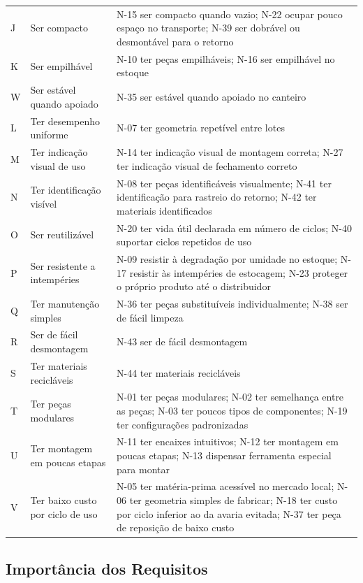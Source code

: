 \begin{longtable}{@{}L{1.1cm}@{\hspace{0.35cm}}L{4.0cm}@{\hspace{0.35cm}}L{9.8cm}@{}}
J & Ser compacto & N-15 ser compacto quando vazio; N-22 ocupar pouco espaço no transporte; N-39 ser dobrável ou desmontável para o retorno \\
K & Ser empilhável & N-10 ter peças empilháveis; N-16 ser empilhável no estoque \\
W & Ser estável quando apoiado & N-35 ser estável quando apoiado no canteiro \\
L & Ter desempenho uniforme & N-07 ter geometria repetível entre lotes \\
M & Ter indicação visual de uso & N-14 ter indicação visual de montagem correta; N-27 ter indicação visual de fechamento correto \\
N & Ter identificação visível & N-08 ter peças identificáveis visualmente; N-41 ter identificação para rastreio do retorno; N-42 ter materiais identificados \\
O & Ser reutilizável & N-20 ter vida útil declarada em número de ciclos; N-40 suportar ciclos repetidos de uso \\
P & Ser resistente a intempéries & N-09 resistir à degradação por umidade no estoque; N-17 resistir às intempéries de estocagem; N-23 proteger o próprio produto até o distribuidor \\
Q & Ter manutenção simples & N-36 ter peças substituíveis individualmente; N-38 ser de fácil limpeza \\
R & Ser de fácil desmontagem & N-43 ser de fácil desmontagem \\
S & Ter materiais recicláveis & N-44 ter materiais recicláveis \\
T & Ter peças modulares & N-01 ter peças modulares; N-02 ter semelhança entre as peças; N-03 ter poucos tipos de componentes; N-19 ter configurações padronizadas \\
U & Ter montagem em poucas etapas & N-11 ter encaixes intuitivos; N-12 ter montagem em poucas etapas; N-13 dispensar ferramenta especial para montar \\
V & Ter baixo custo por ciclo de uso & N-05 ter matéria-prima acessível no mercado local; N-06 ter geometria simples de fabricar; N-18 ter custo por ciclo inferior ao da avaria evitada; N-37 ter peça de reposição de baixo custo \\
\bottomrule
\end{longtable}
\normalsize
{}


\subsection{Importância dos Requisitos}

